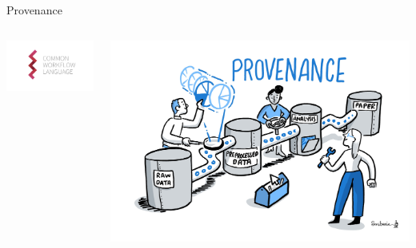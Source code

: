 \documentclass[bigger,unknownkeysallowed,aspectratio=169,red,colorblocks]{beamer}
\begin{document}
\begin{frame}[label={sec:org023aa20}]{Provenance}
\begin{columns}
\begin{column}{0.4\columnwidth}

\begin{center}
\includegraphics[width=.9\linewidth]{images/A_block/2020-09-20_06-42-35_screenshot.png}
\end{center}
\end{column}

\begin{column}{0.6\columnwidth}
\begin{center}
\includegraphics[width=.9\linewidth]{images/turingWay/Provenance.jpg}
\end{center}
\end{column}
\end{columns}
\end{frame}
\end{document}

